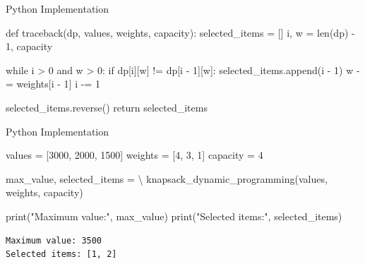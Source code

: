 \documentclass[
  ignorenonframetext,
]{beamer}
\newenvironment{Shaded}{\begin{snugshade}}{\end{snugshade}}
\newcommand{\BuiltInTok}[1]{\textcolor[rgb]{0.00,0.23,0.31}{#1}}
\newcommand{\ControlFlowTok}[1]{\textcolor[rgb]{0.00,0.23,0.31}{#1}}
\newcommand{\DecValTok}[1]{\textcolor[rgb]{0.68,0.00,0.00}{#1}}
\newcommand{\KeywordTok}[1]{\textcolor[rgb]{0.00,0.23,0.31}{#1}}
\newcommand{\NormalTok}[1]{\textcolor[rgb]{0.00,0.23,0.31}{#1}}
\newcommand{\OperatorTok}[1]{\textcolor[rgb]{0.37,0.37,0.37}{#1}}
\newcommand{\StringTok}[1]{\textcolor[rgb]{0.13,0.47,0.30}{#1}}
\begin{document}
\begin{frame}[fragile]{Python Implementation}
\protect\hypertarget{python-implementation-2}{}
\begin{Shaded}
\begin{Highlighting}[]
\KeywordTok{def}\NormalTok{ traceback(dp, values, weights, capacity):}
\NormalTok{  selected\_items }\OperatorTok{=}\NormalTok{ []}
\NormalTok{  i, w }\OperatorTok{=} \BuiltInTok{len}\NormalTok{(dp) }\OperatorTok{{-}} \DecValTok{1}\NormalTok{, capacity}

  \ControlFlowTok{while}\NormalTok{ i }\OperatorTok{\textgreater{}} \DecValTok{0} \KeywordTok{and}\NormalTok{ w }\OperatorTok{\textgreater{}} \DecValTok{0}\NormalTok{:}
    \ControlFlowTok{if}\NormalTok{ dp[i][w] }\OperatorTok{!=}\NormalTok{ dp[i }\OperatorTok{{-}} \DecValTok{1}\NormalTok{][w]:}
\NormalTok{      selected\_items.append(i }\OperatorTok{{-}} \DecValTok{1}\NormalTok{)}
\NormalTok{      w }\OperatorTok{{-}=}\NormalTok{ weights[i }\OperatorTok{{-}} \DecValTok{1}\NormalTok{]}
\NormalTok{      i }\OperatorTok{{-}=} \DecValTok{1}

\NormalTok{  selected\_items.reverse()}
  \ControlFlowTok{return}\NormalTok{ selected\_items}
\end{Highlighting}
\end{Shaded}
\end{frame}

\begin{frame}[fragile]{Python Implementation}
\protect\hypertarget{python-implementation-3}{}
\begin{Shaded}
\begin{Highlighting}[]
\NormalTok{values }\OperatorTok{=}\NormalTok{ [}\DecValTok{3000}\NormalTok{, }\DecValTok{2000}\NormalTok{, }\DecValTok{1500}\NormalTok{]}
\NormalTok{weights }\OperatorTok{=}\NormalTok{ [}\DecValTok{4}\NormalTok{, }\DecValTok{3}\NormalTok{, }\DecValTok{1}\NormalTok{]}
\NormalTok{capacity }\OperatorTok{=} \DecValTok{4}

\NormalTok{max\_value, selected\_items }\OperatorTok{=} \OperatorTok{\textbackslash{}}
\NormalTok{knapsack\_dynamic\_programming(values, weights, capacity)}

\BuiltInTok{print}\NormalTok{(}\StringTok{"Maximum value:"}\NormalTok{, max\_value)}
\BuiltInTok{print}\NormalTok{(}\StringTok{"Selected items:"}\NormalTok{, selected\_items)}
\end{Highlighting}
\end{Shaded}

\begin{verbatim}
Maximum value: 3500
Selected items: [1, 2]
\end{verbatim}
\end{frame}
\end{document}
